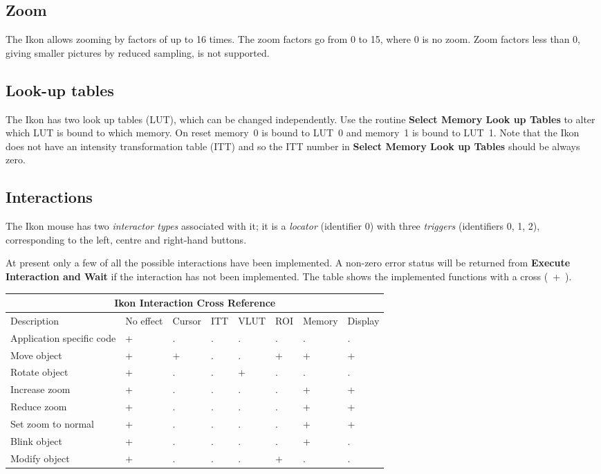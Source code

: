 \subsection{Zoom}

The Ikon allows zooming by factors of up to 16 times. The zoom factors
go from 0 to 15, where 0 is no zoom. Zoom factors less than 0, giving
smaller pictures by reduced sampling, is not supported.

\subsection{Look-up tables}

The Ikon has two look up tables (LUT), which can be changed independently.
Use the routine {\bf Select Memory Look up Tables} to alter which LUT is
bound to which memory. On reset memory~0 is bound to LUT~0 and memory~1
is bound to LUT~1. Note that the Ikon does not have an intensity
transformation table (ITT) and so the ITT number in {\bf Select Memory
Look up Tables} should be always zero.

\subsection{Interactions}

The Ikon mouse has two {\it interactor types} associated with it; it is a
{\it locator} (identifier 0) with three {\it triggers} (identifiers 0, 1, 2),
corresponding to the left, centre and right-hand buttons.

At present only a few of all the possible interactions have been implemented.
A non-zero error status will be returned from {\bf Execute Interaction and
Wait} if the interaction has not been implemented.
The table shows the implemented functions with a cross (~+~).

\begin{small}
\begin{center}
\begin{tabular}{|p{11em}||p{3.0em}||p{3.5em}||p{2.5em}|
                |p{3.5em}||p{3.5em}||p{3.7em}||p{3.5em}|}
\hline
\multicolumn{8}{|c|}{Ikon Interaction Cross Reference} \\ \hline \hline
Description & No effect & Cursor & ITT & VLUT & ROI & Memory & Display \\
\hline
Application specific code & + & . & . & . & . & . & . \\
Move object               & + & + & . & . & + & + & + \\
Rotate object             & + & . & . & + & . & . & . \\
Increase zoom             & + & . & . & . & . & + & + \\
Reduce zoom               & + & . & . & . & . & + & + \\
Set zoom to normal        & + & . & . & . & . & + & + \\
Blink object              & + & . & . & . & . & + & . \\
Modify object             & + & . & . & . & + & . & . \\
\hline
\end{tabular}
\end{center}
\end{small}

